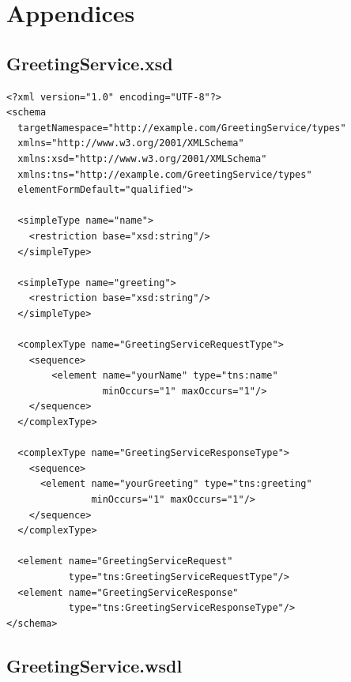 \documentclass{article}
\begin{document}
\clearpage
\newpage

\appendix

\section{Appendices}

\subsection{GreetingService.xsd}
\label{app:xsd}

\begin{verbatim}
<?xml version="1.0" encoding="UTF-8"?> 
<schema 
  targetNamespace="http://example.com/GreetingService/types"
  xmlns="http://www.w3.org/2001/XMLSchema"
  xmlns:xsd="http://www.w3.org/2001/XMLSchema"
  xmlns:tns="http://example.com/GreetingService/types"
  elementFormDefault="qualified">
	
  <simpleType name="name">
    <restriction base="xsd:string"/>
  </simpleType>

  <simpleType name="greeting">
    <restriction base="xsd:string"/>
  </simpleType>

  <complexType name="GreetingServiceRequestType">
    <sequence>
        <element name="yourName" type="tns:name" 
                 minOccurs="1" maxOccurs="1"/>
    </sequence>
  </complexType>

  <complexType name="GreetingServiceResponseType">
    <sequence>
      <element name="yourGreeting" type="tns:greeting" 
               minOccurs="1" maxOccurs="1"/>
    </sequence>
  </complexType>

  <element name="GreetingServiceRequest" 
           type="tns:GreetingServiceRequestType"/>
  <element name="GreetingServiceResponse" 
           type="tns:GreetingServiceResponseType"/>
</schema>
\end{verbatim}

\subsection{GreetingService.wsdl}
\label{app:wsdl}
\end{document}
